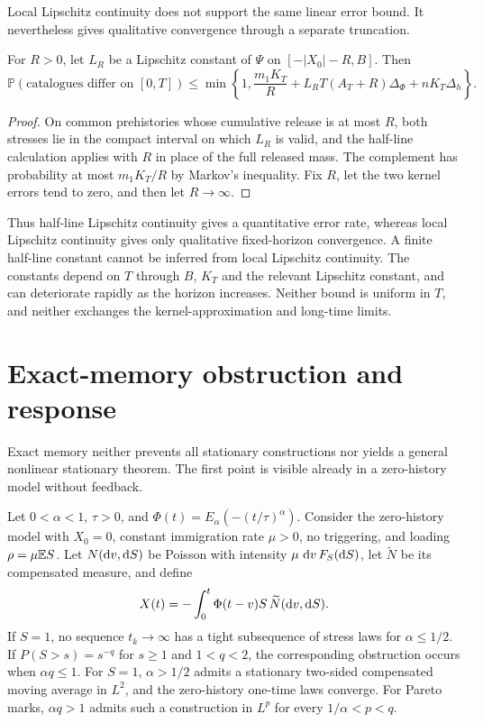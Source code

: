 Local Lipschitz continuity does not support the same linear error bound. It nevertheless gives qualitative convergence through a separate truncation.

\begin{proposition}\label{prop:qualitative-kernel}
For \(R>0\), let \(L_R\) be a Lipschitz constant of \(\Psi\) on \([-|X_0|-R,B]\). Then
\begin{equation}\label{eq:qualitative-kernel}
\mathbb P(\text{catalogues differ on }[0,T])
\leq\min\left\{1,\frac{m_1K_T}{R}
+L_RT(A_T+R)\Delta_\Phi+nK_T\Delta_h\right\}.
\end{equation}
\end{proposition}

\begin{proof}
On common prehistories whose cumulative release is at most \(R\), both stresses lie in the compact interval on which \(L_R\) is valid, and the half-line calculation applies with \(R\) in place of the full released mass. The complement has probability at most \(m_1K_T/R\) by Markov's inequality. Fix \(R\), let the two kernel errors tend to zero, and then let \(R\to\infty\).
\end{proof}

Thus half-line Lipschitz continuity gives a quantitative error rate, whereas local Lipschitz continuity gives only qualitative fixed-horizon convergence. A finite half-line constant cannot be inferred from local Lipschitz continuity. The constants depend on \(T\) through \(B\), \(K_T\) and the relevant Lipschitz constant, and can deteriorate rapidly as the horizon increases. Neither bound is uniform in \(T\), and neither exchanges the kernel-approximation and long-time limits.

\section{Exact-memory obstruction and response}

Exact memory neither prevents all stationary constructions nor yields a general nonlinear stationary theorem. The first point is visible already in a zero-history model without feedback.

\begin{proposition}\label{prop:exact-obstruction}
Let \(0<\alpha<1\), \(\tau>0\), and
\(\Phi(t)=E_\alpha(-(t/\tau)^\alpha)\). Consider the zero-history model with \(X_0=0\), constant immigration rate \(\mu>0\), no triggering, and loading \(\rho=\mu\mathbb{E}  S\). Let \(N(\mathop{}\!\mathrm{d} v,\mathop{}\!\mathrm{d} S)\) be Poisson with intensity \(\mu\,\mathop{}\!\mathrm{d} v\,F_S(\mathop{}\!\mathrm{d} S)\), let \(\widetilde N\) be its compensated measure, and define
\[
X(t)=-\int_0^t\Phi(t-v)S\,\widetilde N(\mathop{}\!\mathrm{d} v,\mathop{}\!\mathrm{d} S).
\]
If \(S=1\), no sequence \(t_k\to\infty\) has a tight subsequence of stress laws for \(\alpha\leq1/2\). If \(P(S>s)=s^{-q}\) for \(s\geq1\) and \(1<q<2\), the corresponding obstruction occurs when \(\alpha q\leq1\). For \(S=1\), \(\alpha>1/2\) admits a stationary two-sided compensated moving average in \(L^2\), and the zero-history one-time laws converge. For Pareto marks, \(\alpha q>1\) admits such a construction in \(L^p\) for every \(1/\alpha<p<q\).
\end{proposition}

